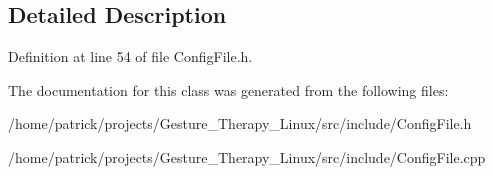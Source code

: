 \subsection{Detailed Description}


Definition at line 54 of file Config\+File.\+h.



The documentation for this class was generated from the following files\+:\begin{DoxyCompactItemize}
\item 
/home/patrick/projects/\+Gesture\+\_\+\+Therapy\+\_\+\+Linux/src/include/Config\+File.\+h\item 
/home/patrick/projects/\+Gesture\+\_\+\+Therapy\+\_\+\+Linux/src/include/Config\+File.\+cpp\end{DoxyCompactItemize}
